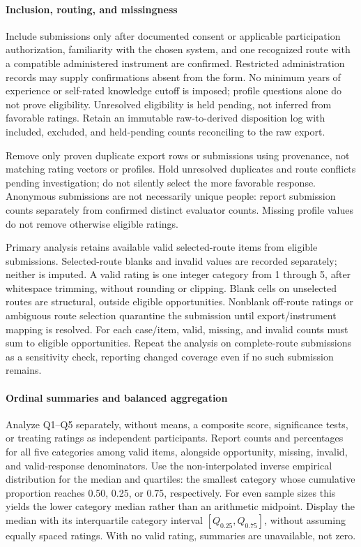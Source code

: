 \paragraph{Inclusion, routing, and missingness}
Include submissions only after documented consent or applicable participation
authorization, familiarity with the chosen system, and one recognized route
with a compatible administered instrument are confirmed. Restricted
administration records may supply confirmations absent from the form.
No minimum years of experience or self-rated knowledge cutoff is imposed;
profile questions alone do not prove eligibility. Unresolved eligibility
is held pending, not inferred from favorable ratings. Retain an immutable
raw-to-derived disposition log with included, excluded, and held-pending
counts reconciling to the raw export.

Remove only proven duplicate export rows or submissions using provenance,
not matching rating vectors or profiles. Hold unresolved duplicates and route
conflicts pending investigation; do not silently select the more favorable
response. Anonymous submissions are not necessarily unique people: report
submission counts separately from confirmed distinct evaluator counts.
Missing profile values do not remove otherwise eligible ratings.

Primary analysis retains available valid selected-route items from eligible
submissions. Selected-route blanks and invalid values are recorded separately;
neither is imputed. A valid rating is one integer category from 1 through 5,
after whitespace trimming, without rounding or clipping. Blank cells on
unselected routes are structural, outside eligible opportunities.
Nonblank off-route ratings or ambiguous route selection quarantine the
submission until export/instrument mapping is resolved. For each case/item,
valid, missing, and invalid counts must sum to eligible opportunities.
Repeat the analysis on complete-route submissions as a sensitivity check,
reporting changed coverage even if no such submission remains.

\paragraph{Ordinal summaries and balanced aggregation}
Analyze Q1--Q5 separately, without means, a composite score, significance
tests, or treating ratings as independent participants. Report counts and
percentages for all five categories among valid items, alongside opportunity,
missing, invalid, and valid-response denominators. Use the non-interpolated
inverse empirical distribution for the median and quartiles: the smallest
category whose cumulative proportion reaches 0.50, 0.25, or 0.75, respectively.
For even sample sizes this yields the lower category median rather than an
arithmetic midpoint. Display the median with its interquartile category
interval $[Q_{0.25},Q_{0.75}]$, without assuming equally spaced ratings.
With no valid rating, summaries are unavailable, not zero.

